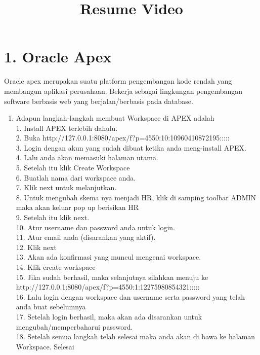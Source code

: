 \clearpage
\setcounter{page}{1}

\begin{center}
\title{\LARGE \bf Resume Video}
\end{center}

\section*{\normalsize 1. Oracle Apex} 
\hspace {\parindent}Oracle apex merupakan suatu platform pengembangan kode rendah yang membangun aplikasi perusahaan. Bekerja sebagai lingkungan pengembangan software berbasis web yang berjalan/berbasis pada database.
\begin{enumerate}[label=\alph*.]
\item Adapun langkah-langkah membuat Workspace di APEX adalah\\
1. Install APEX terlebih dahulu.\\
2. Buka http://127.0.0.1:8080/apex/f?p=4550:10:10960410872195:::::\\
3. Login dengan akun yang sudah dibuat ketika anda meng-install APEX.\\
4. Lalu anda akan memasuki halaman utama.\\
5. Setelah itu klik Create Workspace\\
6. Buatlah nama dari workspace anda.\\
7. Klik next untuk melanjutkan.\\
8. Untuk mengubah skema nya menjadi HR, klik di samping toolbar ADMIN maka akan keluar pop up berisikan HR\\
9. Setelah itu klik next.\\
10. Atur username dan password anda untuk login.\\
11. Atur email anda (disarankan yang aktif).\\
12. Klik next\\
13. Akan ada konﬁrmasi yang muncul mengenai workspace.\\
14. Klik create workspace\\
15. Jika sudah berhasil, maka selanjutnya silahkan menuju ke http://127.0.0.1:8080/apex/f?p=4550:1:12275980854321:::::\\
16. Lalu login dengan workspace dan username serta password yang telah anda buat sebelumnya\\
17. Setelah login berhasil, maka akan ada disarankan untuk mengubah/memperbaharui password.\\
18. Setelah semua langkah telah selesai maka anda akan di bawa ke halaman Workspace. Selesai\\
\end{enumerate}

